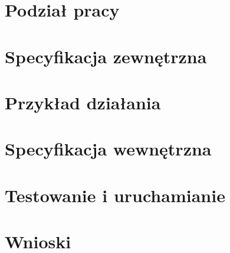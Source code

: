 \documentclass[a4paper,twoside]{article}
\begin{document}
	\newpage
	\part{\huge \textbf{Podział pracy}}
	
	\newpage
	\part{\huge \textbf{Specyfikacja zewnętrzna}}
	
	\newpage
	\part{\huge \textbf{Przykład działania}}
	
	\newpage
	\part{\huge \textbf{Specyfikacja wewnętrzna}}
	
	\newpage
	\part{\huge \textbf{Testowanie i uruchamianie}}
	
	\newpage
	\part{\huge \textbf{Wnioski}}
	
	
	
	
	
	
	
	
	
	
	
	
	
	
	
	
	
	
	
\end{document}
